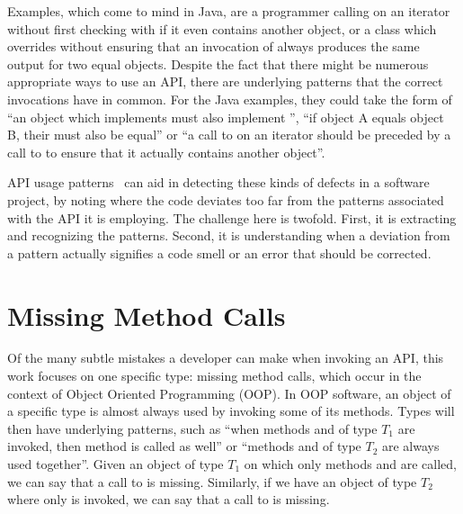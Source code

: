 Examples, which come to mind in Java, are a programmer calling  on an iterator without first checking with  if it even contains another object, or a class which overrides  without ensuring that an invocation of  always produces the same output for two equal objects.
Despite the fact that there might be numerous appropriate ways to use an API, there are underlying patterns that the correct invocations have in common.
For the Java examples, they could take the form of ``an object which implements  must also implement '', ``if object A equals object B, their  must also be equal'' or ``a call to  on an iterator should be preceded by a call to  to ensure that it actually contains another object''.

API usage patterns~\cite{robillard2013automated} can aid in detecting these kinds of defects in a software project, by noting where the code deviates too far from the patterns associated with the API it is employing.
The challenge here is twofold.
First, it is extracting and recognizing the patterns.
Second, it is understanding when a deviation from a pattern actually signifies a code smell or an error that should be corrected.

\section{Missing Method Calls}

Of the many subtle mistakes a developer can make when invoking an API, this work focuses on one specific type: missing method calls, which occur in the context of Object Oriented Programming (OOP).
In OOP software, an object of a specific type is almost always used by invoking some of its methods.
Types will then have underlying patterns, such as ``when methods  and  of type $T_1$ are invoked, then method  is called as well'' or ``methods  and  of type $T_2$ are always used together''.
Given an object of type $T_1$ on which only methods  and  are called, we can say that a call to  is missing.
Similarly, if we have an object of type $T_2$ where only  is invoked, we can say that a call to  is missing.

